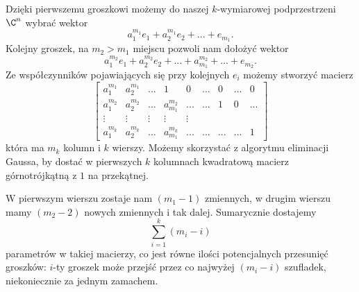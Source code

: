 \begin{enumerate}[label=\textbf{(\alph*)}]
\begin{center}
\end{center}
    Dzięki pierwszemu groszkowi możemy do naszej $k$-wymiarowej podprzestrzeni $\C^n$ wybrać wektor
    $$a_1^{m_1}e_1+a_2^{m_1}e_2+...+e_{m_1}.$$
    Kolejny groszek, na $m_2> m_1$ miejscu pozwoli nam dołożyć wektor
    $$a_1^{m_2}e_1+a_2^{m_2}e_2+...+a_{m_1}^{m_2}+...+e_{m_2}.$$
    Ze współczynników pojawiających się przy kolejnych $e_i$ możemy stworzyć macierz
    $$
    \begin{bmatrix}
      a_1^{m_1} & a_2^{m_1} & ... & 1 & 0 & ... & 0 & ... & 0\\ 
      a_1^{m_2} & a_2^{m_2} & ... & a_{m_1}^{m_2} & ... & ... & 1 & 0 & ...\\ 
      \vdots & \vdots & \vdots & \vdots & \vdots\\ 
      a_1^{m_k} & a_2^{m_k} & ... & a_{m_1}^{m_k} & ... & ... & ... & ... & 1 
    \end{bmatrix}
    $$
    która ma $m_k$ kolumn i $k$ wierszy. Możemy skorzystać z algorytmu eliminacji Gaussa, by dostać w pierwszych $k$ kolumnach kwadratową macierz górnotrójkątną z $1$ na przekątnej. 

    W pierwszym wierszu zostaje nam $(m_1-1)$ zmiennych, w drugim wierszu mamy $(m_2-2)$ nowych zmiennych i tak dalej. Sumarycznie dostajemy
    $$\sum_{i=1}^k(m_i-i)$$
    parametrów w takiej macierzy, co jest równe ilości potencjalnych przesunięć groszków: $i$-ty groszek może przejść przez co najwyżej $(m_i-i)$ szufladek, niekoniecznie za jednym zamachem.


\end{enumerate}
